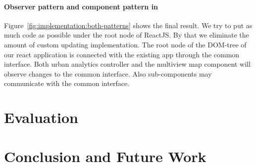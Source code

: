 \paragraph{Observer pattern and component pattern in \cmvs{}}
Figure~\ref{fig:implementation:both-patterns} shows the final result.
We try to put as much code as possible under the root node of ReactJS\@.
By that we eliminate the amount of custom updating implementation.
The root node of the DOM-tree of our react application is connected with the existing app through the common interface.
Both urban analytics controller and the multiview map component will observe changes to the common interface.
Also sub-components may communicate with the common interface.






\clearpage

\section{Evaluation}\label{sec:evaluation}

\section{Conclusion and Future Work}\label{sec:conclusion}




\clearpage




%

